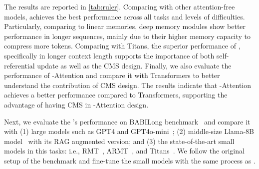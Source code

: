 The results are reported in \autoref{tab:ruler}. Comparing with other attention-free models, \model{} achieves the best performance across all tasks and levels of difficulties. Particularly, comparing to linear memories, deep memory modules show better performance in longer sequences, mainly due to their higher memory capacity to compress more tokens. Comparing \model{} with Titans, the superior performance of \model, specifically in longer context length supports the importance of both self-referential update as well as the CMS design. Finally, we also evaluate the performance of \model-Attention and compare it with Transformers to better understand the contribution of CMS design. The results indicate that \model-Attention achieves a better performance compared to Transformers, supporting the advantage of having CMS in \model-Attention design. 







 Next, we evaluate the \model's performance on BABILong benchmark~\citep{kuratov2024babilong} and compare it with (1) large models such as GPT4 and GPT4o-mini~\citep{achiam2023gpt}; (2) middle-size Llama-8B model~\citep{dubey2024llama} with its RAG augmented version; and (3) the state-of-the-art small models in this tasks: i.e., RMT~\citep{bulatov2022recurrent}, ARMT~\citep{rodkin2024associative}, and Titans~\citep{behrouz2024titans}. We follow the original setup of the benchmark and fine-tune the small models with the same process as \citet{kuratov2024babilong}. 


